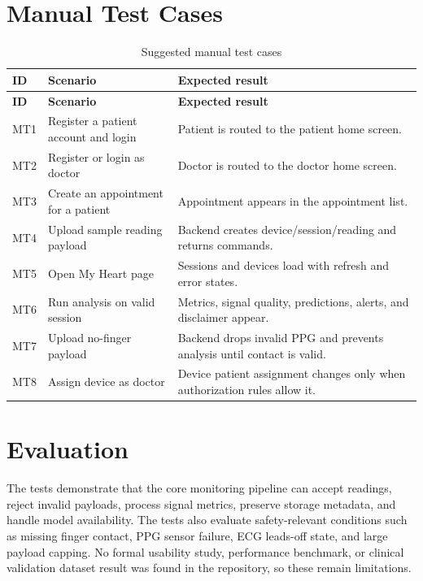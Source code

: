 \section{Manual Test Cases}

\begin{longtable}{p{} p{} p{}}
\caption{Suggested manual test cases}\\
\toprule
\textbf{ID} & \textbf{Scenario} & \textbf{Expected result}\\
\midrule
\endfirsthead
\toprule
\textbf{ID} & \textbf{Scenario} & \textbf{Expected result}\\
\midrule
\endhead
MT1 & Register a patient account and login & Patient is routed to the patient home screen.\\
MT2 & Register or login as doctor & Doctor is routed to the doctor home screen.\\
MT3 & Create an appointment for a patient & Appointment appears in the appointment list.\\
MT4 & Upload sample reading payload & Backend creates device/session/reading and returns commands.\\
MT5 & Open My Heart page & Sessions and devices load with refresh and error states.\\
MT6 & Run analysis on valid session & Metrics, signal quality, predictions, alerts, and disclaimer appear.\\
MT7 & Upload no-finger payload & Backend drops invalid PPG and prevents analysis until contact is valid.\\
MT8 & Assign device as doctor & Device patient assignment changes only when authorization rules allow it.\\
\bottomrule
\end{longtable}

\section{Evaluation}

The tests demonstrate that the core monitoring pipeline can accept readings, reject invalid payloads, process signal metrics, preserve storage metadata, and handle model availability. The tests also evaluate safety-relevant conditions such as missing finger contact, PPG sensor failure, ECG leads-off state, and large payload capping. No formal usability study, performance benchmark, or clinical validation dataset result was found in the repository, so these remain limitations.
